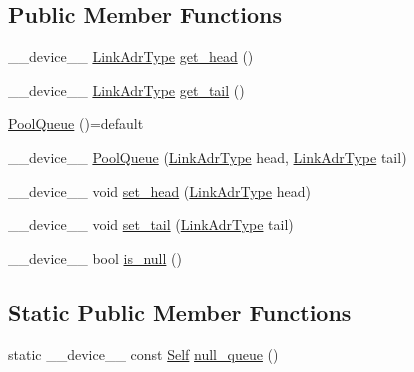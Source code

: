 \subsection*{Public Member Functions}
\begin{DoxyCompactItemize}
\item 
\-\_\-\-\_\-device\-\_\-\-\_\- \hyperlink{structPoolQueue_3_01Adr_3_01ADR__TYPE_01_4_01_4_a0186dae81484804c84ead6583955fe6c}{Link\-Adr\-Type} \hyperlink{structPoolQueue_3_01Adr_3_01ADR__TYPE_01_4_01_4_a5d3bfe36c02c60048ac06c78a35f2ae4}{get\-\_\-head} ()
\item 
\-\_\-\-\_\-device\-\_\-\-\_\- \hyperlink{structPoolQueue_3_01Adr_3_01ADR__TYPE_01_4_01_4_a0186dae81484804c84ead6583955fe6c}{Link\-Adr\-Type} \hyperlink{structPoolQueue_3_01Adr_3_01ADR__TYPE_01_4_01_4_acf9e538f601bf9cb8abb73d906e9ccdf}{get\-\_\-tail} ()
\item 
\hyperlink{structPoolQueue_3_01Adr_3_01ADR__TYPE_01_4_01_4_a70c320ad1ab0dca70b893bd4268c3c68}{Pool\-Queue} ()=default
\item 
\-\_\-\-\_\-device\-\_\-\-\_\- \hyperlink{structPoolQueue_3_01Adr_3_01ADR__TYPE_01_4_01_4_a20c834001a9a1ba4b11b0eed852cf8f6}{Pool\-Queue} (\hyperlink{structPoolQueue_3_01Adr_3_01ADR__TYPE_01_4_01_4_a0186dae81484804c84ead6583955fe6c}{Link\-Adr\-Type} head, \hyperlink{structPoolQueue_3_01Adr_3_01ADR__TYPE_01_4_01_4_a0186dae81484804c84ead6583955fe6c}{Link\-Adr\-Type} tail)
\item 
\-\_\-\-\_\-device\-\_\-\-\_\- void \hyperlink{structPoolQueue_3_01Adr_3_01ADR__TYPE_01_4_01_4_a425d894b964c2ef88afd2c818ed77edf}{set\-\_\-head} (\hyperlink{structPoolQueue_3_01Adr_3_01ADR__TYPE_01_4_01_4_a0186dae81484804c84ead6583955fe6c}{Link\-Adr\-Type} head)
\item 
\-\_\-\-\_\-device\-\_\-\-\_\- void \hyperlink{structPoolQueue_3_01Adr_3_01ADR__TYPE_01_4_01_4_a61cbf9ed8ad008455efbc0b07e4e6651}{set\-\_\-tail} (\hyperlink{structPoolQueue_3_01Adr_3_01ADR__TYPE_01_4_01_4_a0186dae81484804c84ead6583955fe6c}{Link\-Adr\-Type} tail)
\item 
\-\_\-\-\_\-device\-\_\-\-\_\- bool \hyperlink{structPoolQueue_3_01Adr_3_01ADR__TYPE_01_4_01_4_a5b5c0a11c357801557a5ec0701e5569c}{is\-\_\-null} ()
\end{DoxyCompactItemize}
\subsection*{Static Public Member Functions}
\begin{DoxyCompactItemize}
\item 
static \-\_\-\-\_\-device\-\_\-\-\_\- const \hyperlink{structPoolQueue_3_01Adr_3_01ADR__TYPE_01_4_01_4_a93fe6b86d79f9e652e155b9431473418}{Self} \hyperlink{structPoolQueue_3_01Adr_3_01ADR__TYPE_01_4_01_4_a9d9e19909b0e6d53360ae59ff6c056fd}{null\-\_\-queue} ()
\end{DoxyCompactItemize}

